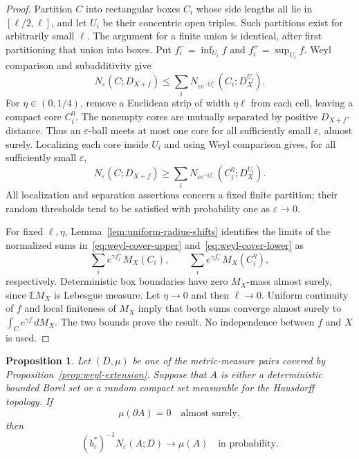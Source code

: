 \documentclass[11pt,letterpaper]{article}
\newcommand{\E}{\mathbb E}
\newcommand{\eps}{\varepsilon}
\newtheorem{proposition}[theorem]{Proposition}
\theoremstyle{definition}
\theoremstyle{remark}
\numberwithin{equation}{section}
\begin{document}
\begin{proof}
Partition $C$ into rectangular boxes $C_i$ whose side lengths all lie in $[\ell/2,\ell]$, and let $U_i$ be their concentric open triples. Such partitions exist for arbitrarily small $\ell$. The argument for a finite union is identical, after first partitioning that union into boxes. Put $f_i^- =\inf_{U_i}f$ and $f_i^+=\sup_{U_i}f$. Weyl comparison and subadditivity give
\begin{equation}\label{eq:weyl-cover-upper}
 N_\eps(C;D_{X+f})
 \le\sum_i N_{\eps e^{-\xi f_i^+}}(C_i;D_X^{U_i}).
\end{equation}
For $\eta\in(0,1/4)$, remove a Euclidean strip of width $\eta\ell$ from each cell, leaving a compact core $C_i^\eta$. The nonempty cores are mutually separated by positive $D_{X+f}$-distance. Thus an $\eps$-ball meets at most one core for all sufficiently small $\eps$, almost surely. Localizing each core inside $U_i$ and using Weyl comparison gives, for all sufficiently small $\eps$,
\begin{equation}\label{eq:weyl-cover-lower}
 N_\eps(C;D_{X+f})
 \ge\sum_i N_{\eps e^{-\xi f_i^-}}(C_i^\eta;D_X^{U_i}).
\end{equation}
All localization and separation assertions concern a fixed finite partition; their random thresholds tend to be satisfied with probability one as $\eps\to0$.

For fixed $\ell,\eta$, Lemma~\ref{lem:uniform-radius-shifts} identifies the limits of the normalized sums in~\eqref{eq:weyl-cover-upper} and~\eqref{eq:weyl-cover-lower} as
\begin{equation*}
 \sum_i e^{\gamma f_i^+}M_X(C_i),
 \qquad
 \sum_i e^{\gamma f_i^-}M_X(C_i^\eta),
\end{equation*}
respectively. Deterministic box boundaries have zero $M_X$-mass almost surely, since $\E M_X$ is Lebesgue measure. Let $\eta\to0$ and then $\ell\to0$. Uniform continuity of $f$ and local finiteness of $M_X$ imply that both sums converge almost surely to $\int_C e^{\gamma f}\,dM_X$. The two bounds prove the result. No independence between $f$ and $X$ is used.
\end{proof}

\begin{proposition}\label{prop:random-sets}
Let $(D,\mu)$ be one of the metric-measure pairs covered by Proposition~\ref{prop:weyl-extension}. Suppose that $A$ is either a deterministic bounded Borel set or a random compact set measurable for the Hausdorff topology. If
\begin{equation*}
 \mu(\partial A)=0\quad\text{almost surely},
\end{equation*}
then
\begin{equation*}
 (b_\eps^*)^{-1}N_\eps(A;D)\longrightarrow\mu(A)
 \quad\text{in probability}.
\end{equation*}
\end{proposition}
\end{document}
